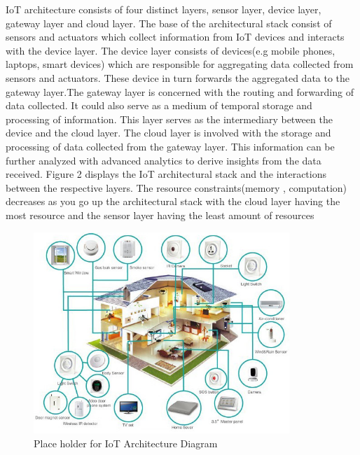 IoT architecture consists of four distinct layers, sensor layer, device layer, gateway layer and cloud layer. The base of the architectural stack consist of sensors and actuators which collect information from IoT devices and interacts with the device layer. The device layer consists of devices(e.g mobile phones, laptops, smart devices) which are responsible for aggregating data collected from sensors and actuators. These device in turn forwards the aggregated data to the gateway layer.The gateway layer is concerned with the routing and forwarding of data collected. It could also serve as a medium of temporal storage and processing of information. This layer serves as the intermediary between the device and the cloud layer. The cloud layer is involved with the storage and processing of data collected from the gateway layer. This information can be further analyzed with advanced analytics to derive insights from the data received.  Figure 2 displays the IoT architectural stack and the interactions between the respective  layers. The resource constraints(memory , computation) decreases as you go up the architectural stack with the cloud layer having the most resource and the sensor layer having the least amount of resources


\begin{figure}[h!]
\begin{center}

\includegraphics[height=3in]{smarthome-diagram.png}
\end{center}
\caption{Place holder for IoT Architecture Diagram}

\end{figure}



